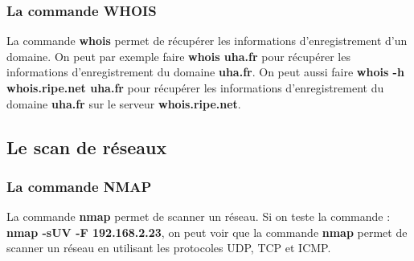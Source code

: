 \documentclass[12pt, a4paper]{article}
\begin{document}
\subsubsection{La commande WHOIS}
La commande \textbf{whois} permet de récupérer les informations d'enregistrement d'un domaine.
On peut par exemple faire \textbf{whois uha.fr} pour récupérer les informations d'enregistrement
du domaine \textbf{uha.fr}. On peut aussi faire \textbf{whois -h whois.ripe.net uha.fr} pour
récupérer les informations d'enregistrement du domaine \textbf{uha.fr} sur le serveur
\textbf{whois.ripe.net}.

\subsection{Le scan de réseaux}
\subsubsection{La commande NMAP}
La commande \textbf{nmap} permet de scanner un réseau. Si on teste la commande :
\textbf{nmap -sUV -F 192.168.2.23}, on peut voir que la commande \textbf{nmap} permet de scanner
un réseau en utilisant les protocoles UDP, TCP et ICMP.
\end{document}
